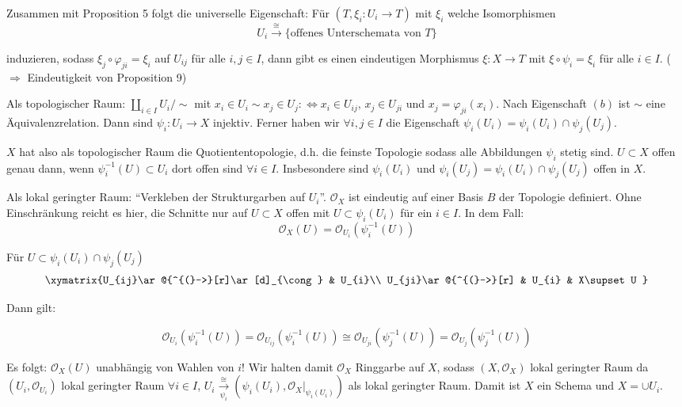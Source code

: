 Zusammen mit Proposition 5 folgt die universelle Eigenschaft: Für
$(T,\xi_{i}:U_{i}\rightarrow T)$ mit $\xi_{i}$ welche Isomorphismen
\[
  U_{i}\overset{\cong}{\rightarrow}\text{\{offenes Unterschemata von }T\}
\]

induzieren, sodass $\xi_{j}\circ\varphi_{ji}=\xi_{i}$ auf $U_{ij}$
für alle $i,j\in I$, dann gibt es einen eindeutigen Morphismus $\xi:X\rightarrow T$
mit $\xi\circ\psi_{i}=\xi_{i}$ für alle $i\in I$. ($\Longrightarrow$
Eindeutigkeit von Proposition 9)

Als topologischer Raum: $\coprod_{i\in I}U_{i}/\sim$ mit $x_{i}\in U_{i}\sim x_{j}\in U_{j}:\Leftrightarrow x_{i}\in U_{ij}$,
$x_{j}\in U_{ji}$ und $x_{j}=\varphi_{ji}(x_{i})$. Nach Eigenschaft
$(b)$ ist $\sim$ eine Äquivalenzrelation. Dann sind $\psi_{i}:U_{i}\rightarrow X$
injektiv. Ferner haben wir $\forall i,j\in I$ die Eigenschaft $\psi_{i}(U_{i})=\psi_{i}(U_{i})\cap\psi_{j}(U_{j})$.

$X$ hat also als topologischer Raum die Quotiententopologie, d.h.
die feinste Topologie sodass alle Abbildungen $\psi_{i}$ stetig sind.
$U\subset X$ offen genau dann, wenn $\psi_{i}^{-1}(U)\subset U_{i}$
dort offen sind $\forall i\in I$. Insbesondere sind $\psi_{i}(U_{i})$
und $\psi_{i}(U_{j})=\psi_{i}(U_{i})\cap\psi_{j}(U_{j})$ offen in
$X$.

Als lokal geringter Raum: ``Verkleben der Strukturgarben auf $U_{i}$''.
$\mathcal{O}_{X}$ ist eindeutig auf einer Basis $B$ der Topologie
definiert. Ohne Einschränkung reicht es hier, die Schnitte nur auf
$U\subset X$ offen mit $U\subset\psi_{i}(U_{i})$ für ein $i\in I$.
In dem Fall:
\[
  \mathcal{O}_{X}(U)=\mathcal{O}_{U_{i}}(\psi_{i}^{-1}(U))
\]

Für $U\subset\psi_{i}(U_{i})\cap\psi_{j}(U_{j})$
\[
  \xymatrix{U_{ij}\ar@{^{(}->}[r]\ar[d]_{\cong} & U_{i}\\
    U_{ji}\ar@{^{(}->}[r] & U_{i} & X\supset U
  }
\]

Dann gilt:

\[
  \mathcal{O}_{U_{i}}(\psi_{i}^{-1}(U))=\mathcal{O}_{U_{ij}}(\psi_{i}^{-1}(U))\cong\mathcal{O}_{U_{ji}}(\psi_{j}^{-1}(U))=\mathcal{O}_{U_{j}}(\psi_{j}^{-1}(U))
\]

Es folgt: $\mathcal{O}_{X}(U)$ unabhängig von Wahlen von $i$! Wir
halten damit $\mathcal{O}_{X}$ Ringgarbe auf $X$, sodass $(X,\mathcal{O}_{X})$
lokal geringter Raum da $(U_{i},\mathcal{O}_{U_{i}})$ lokal geringter
Raum $\forall i\in I$, $U_{i}\xrightarrow[\psi_{i}]{\cong}(\psi_{i}(U_{i}),\mathcal{O}_{X}|_{\psi_{i}(U_{i})})$
als lokal geringter Raum. Damit ist $X$ ein Schema und $X=\cup U_{i}$.

